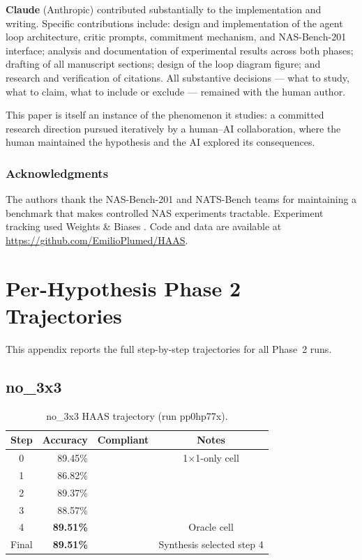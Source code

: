 \documentclass[10pt]{article}
\newcommand{\cmark}{\ding{51}}
\begin{document}
\textbf{Claude} (Anthropic) contributed substantially to the implementation and
writing. Specific contributions include: design and implementation of the agent
loop architecture, critic prompts, commitment mechanism, and NAS-Bench-201
interface; analysis and documentation of experimental results across both phases;
drafting of all manuscript sections; design of the loop diagram figure; and
research and verification of citations. All substantive decisions --- what to
study, what to claim, what to include or exclude --- remained with the human
author.

This paper is itself an instance of the phenomenon it studies: a committed
research direction pursued iteratively by a human--AI collaboration, where the
human maintained the hypothesis and the AI explored its consequences.

\subsubsection*{Acknowledgments}

The authors thank the NAS-Bench-201 and NATS-Bench teams
\citep{dong2020nasbench201, dong2021nats} for maintaining a benchmark that makes
controlled NAS experiments tractable. Experiment tracking used Weights \& Biases
\citep{wandb}. Code and data are available at
\url{https://github.com/EmilioPlumed/HAAS}.




\appendix

\section{Per-Hypothesis Phase 2 Trajectories}
\label{app:trajectories}

This appendix reports the full step-by-step trajectories for all Phase~2 runs.

\subsection{no\_3x3}

\begin{table}[H]
\caption{no\_3x3 HAAS trajectory (run pp0hp77x).}
\begin{center}
\small
\begin{tabular}{crcc}
\toprule
Step & Accuracy & Compliant & Notes \\
\midrule
0     & 89.45\% & \cmark &1$\times$1-only cell \\
1     & 86.82\% & \cmark &\\
2     & 89.37\% & \cmark &\\
3     & 88.57\% & \cmark &\\
4     & \textbf{89.51\%} & \cmark &Oracle cell \\
Final & \textbf{89.51\%} & \cmark &Synthesis selected step 4 \\
\bottomrule
\end{tabular}
\end{center}
\end{table}
\end{document}

